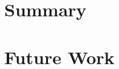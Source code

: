 \cleardoublepage
\label{chap:conclusion}

\section{Summary} \label{chap:conclusion:summary}

\section{Future Work} \label{chap:conclusion:future-work}

